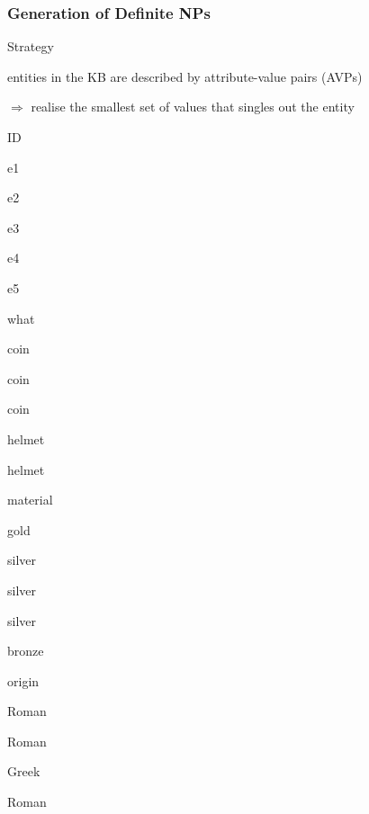 \documentclass[compress,color=usenames]{beamer}
\begin{document}
\begin{frame}
\frametitle{
Generation of Deﬁnite NPs}



Strategy



entities in the KB are described by attribute-value pairs (AVPs)



$\Rightarrow$ realise the smallest set of values that singles out the entity



ID



e1



e2



e3



e4



e5






what



coin



coin



coin



helmet



helmet


material



gold



silver



silver



silver



bronze






origin



Roman



Roman



Greek



Roman




\end{frame}
\end{document}
